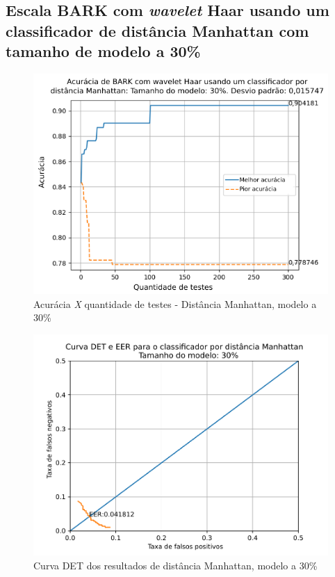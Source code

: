 			\FloatBarrier
		\subsection{Escala BARK com \textit{wavelet} Haar usando um classificador de distância Manhattan com tamanho de modelo a 30\%}
		
			
			
			\begin{figure}[ht]
				\centering
				\includegraphics[width=\linewidth]{images/results/confusionMatrices/classifier_Manhattan_30.png}
				\caption{Acurácia \textit{X} quantidade de testes - Distância Manhattan, modelo a 30\%}
				\label{fig:classifiermanhattan30}
			\end{figure}
		
			\begin{figure}[!ht]
				\centering
				\includegraphics[width=\linewidth]{images/results/det/DET_for_classifier_Manhattan_30}
				\caption{Curva DET dos resultados de distância Manhattan, modelo a 30\%}
				\label{fig:detforclassifiermanhattan30}
			\end{figure}
			
